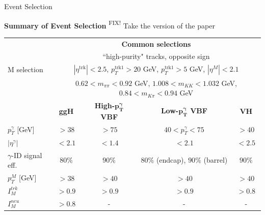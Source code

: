 \documentclass[9pt,aspectratio=1610]{beamer}
\newcommand{\khl}[1]{\textbf{\color{structure}#1}}
\newcommand{\ktodo}[1]{\colorbox{yellow!30}{{\color{red}\textsuperscript{\tiny FIX! }}#1}}
\begin{document}
\begin{frame}{Event Selection}
	
	\khl{Summary of Event Selection}
	\vspace{0.2em}
	\ktodo{Take the version of the paper}
	\begin{table}[!ht]
		\centering
		\footnotesize
		\begin{tabular}{|l|c|c|c|c|}
			\hhline{|=====|}
			& \multicolumn{4}{c|}{\textbf{Common selections}}\\
			\hhline{|=====|}
			& \multicolumn{4}{C{36em}|}{``high-purity" tracks, opposite sign} \\
			M selection & \multicolumn{4}{C{36em}|}{\(|\eta^{\mathrm{trk}}| < 2.5\),  \(p_T^{\mathrm{trk1}} > 20\) GeV,   \(p_T^{\mathrm{trk1}} > 5\) GeV,  \(|\eta^M| < 2.1\)} \\
			& \multicolumn{4}{C{36em}|}{\(0.62 < m_{\pi\pi} < 0.92\) GeV,  \(1.008 < m_{KK} < 1.032\) GeV,  \(0.84 < m_{K\pi} < 0.94\) GeV} \\
			\hhline{|=====|}
			& \multicolumn{1}{C{8em}}{\textbf{ggH}} & \multicolumn{1}{C{8em}}{\textbf{High-\(\mathbf{p^\gamma_T}\) VBF}} & \multicolumn{1}{C{8em}}{\textbf{Low-\(\mathbf{p^\gamma_T}\) VBF}} &  \multicolumn{1}{C{8em}|}{\textbf{VH}} \\
			\hline
			\(p^\gamma_T\) [GeV] & \multicolumn{1}{C{8em}}{\(> 38\)} & \multicolumn{1}{C{8em}}{\(> 75\)} & \multicolumn{1}{C{8em}}{\(40 < p^\gamma_T < 75\)} & \multicolumn{1}{C{8em}|}{\(> 40\)}\\
			\(|\eta^\gamma|\) & \multicolumn{1}{C{8em}}{\(< 2.1\)} & \multicolumn{1}{C{8em}}{\(< 1.4\)} & \multicolumn{1}{C{8em}}{\(< 2.1\)} & \multicolumn{1}{C{8em}|}{\(< 2.5\)}\\
			\(\gamma\)-ID signal eff. & \multicolumn{1}{C{8em}}{\(80\%\)} & \multicolumn{1}{C{8em}}{\(90\%\)} & \multicolumn{1}{C{8em}}{\(80\%\) (endcap), \(90\%\) (barrel)} & \multicolumn{1}{C{8em}|}{\(90\%\)}\\
			\hline
			\(p^M_T\) [GeV] & \multicolumn{1}{C{8em}}{\(> 38\)} & \multicolumn{1}{C{8em}}{\(> 40\)} & \multicolumn{1}{C{8em}}{\(> 40\)} & \multicolumn{1}{C{8em}|}{\(> 40\)}\\
			\(I^{trk}_M\) & \multicolumn{1}{C{8em}}{\(> 0.9\)} & \multicolumn{1}{C{8em}}{\(> 0.9\)} & \multicolumn{1}{C{8em}}{\(> 0.9\)} & \multicolumn{1}{C{8em}|}{\(> 0.8\)}\\
			\(I^{neu}_M\) & \multicolumn{1}{C{8em}}{\(> 0.8\)} & \multicolumn{1}{C{8em}}{-} & \multicolumn{1}{C{8em}}{-} & \multicolumn{1}{C{8em}|}{-}\\

\end{tabular}
\end{table}
\end{frame}
\end{document}
